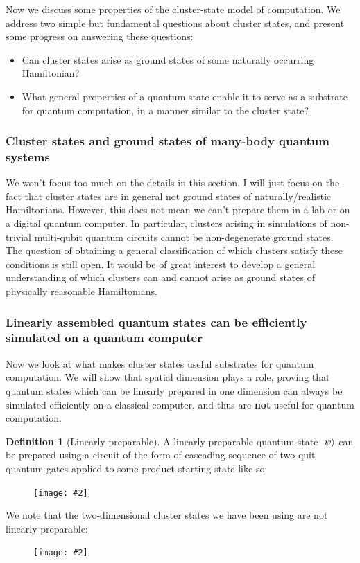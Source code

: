 \documentclass{book}
\theoremstyle{definition}
\newtheorem{defn}{Definition}[section]
\newcommand{\fig}[2]{
	\begin{figure}[!htb]
		\centering
		\texttt{[image: \#2]}
	\end{figure}}
\begin{document}
Now we discuss some properties of the cluster-state model of computation. We address two simple but fundamental questions about cluster states, and present some progress on answering these questions:

\begin{itemize}
	\item Can cluster states arise as ground states of some naturally occurring Hamiltonian? 
	
	\item What general properties of a quantum state enable it to serve as a substrate for quantum computation, in a manner similar to the cluster state? 
\end{itemize}




\subsubsection{Cluster states and ground states of many-body quantum systems}


We won't focus too much on the details in this section. I will just focus on the fact that cluster states are in general not ground states of naturally/realistic Hamiltonians. However, this does not mean we can't prepare them in a lab or on a digital quantum computer. In particular, clusters arising in simulations of non-trivial multi-qubit quantum circuits cannot be non-degenerate ground states. \\

The question of obtaining a general classification of which clusters satisfy these conditions is still open. It would be of great interest to develop a general understanding of which clusters can and cannot arise as ground states of physically reasonable Hamiltonians.  


\subsubsection{Linearly assembled quantum states can be efficiently simulated on a quantum computer}


Now we look at what makes cluster states useful substrates for quantum computation. We will show that spatial dimension plays a role, proving that quantum states which can be linearly prepared in one dimension can always be simulated efficiently on a classical computer, and thus are \textbf{not} useful for quantum computation. 

\begin{defn}[Linearly preparable]
	A linearly preparable quantum state $\ket{\psi}$ can be prepared using a circuit of the form of cascading sequence of two-quit quantum gates applied to some product starting state like so:
	
	\fig{0.35}{linear}
	
	We note that the two-dimensional cluster states we have been using are not linearly preparable:
	
	\fig{0.45}{cluster1}
	
\end{defn}
	
\end{document}
